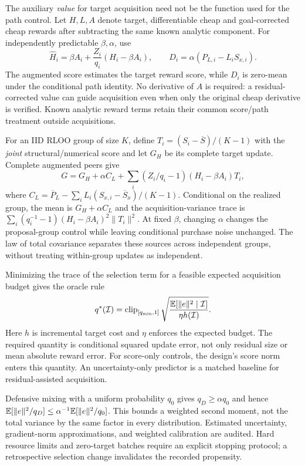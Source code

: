 The auxiliary \emph{value} for target acquisition need not be the function used for the path control. Let $H,L,A$ denote target, differentiable cheap and goal-corrected cheap rewards after subtracting the same known analytic component. For independently predictable $\beta,\alpha$, use
\begin{equation}
\widehat H_i=\beta A_i+\frac{Z_i}{q_i}(H_i-\beta A_i),
\qquad D_i=\alpha(P_{L,i}-L_iS_{x,i}).
\label{eq:value-path-separated}
\end{equation}
The augmented score estimates the target reward score, while $D_i$ is zero-mean under the conditional path identity. No derivative of $A$ is required: a residual-corrected value can guide acquisition even when only the original cheap derivative is verified. Known analytic reward terms retain their common score/path treatment outside acquisitions.

For an IID RLOO group of size $K$, define $T_i=(S_i-\overline S)/(K-1)$ with the \emph{joint} structural/numerical score and let $G_H$ be its complete target update. Complete augmented peers give
\begin{equation}
G=G_H+\alpha C_L+\sum_i(Z_i/q_i-1)(H_i-\beta A_i)T_i,
\label{eq:group-value-path}
\end{equation}
where $C_L=\overline P_L-\sum_i L_i(S_{x,i}-\overline S_x)/(K-1)$. Conditional on the realized group, the mean is $G_H+\alpha C_L$ and the acquisition-variance trace is $\sum_i(q_i^{-1}-1)(H_i-\beta A_i)^2\|T_i\|^2$. At fixed $\beta$, changing $\alpha$ changes the proposal-group control while leaving conditional purchase noise unchanged. The law of total covariance separates these sources across independent groups, without treating within-group updates as independent.

Minimizing the trace of the selection term for a feasible expected acquisition budget gives the oracle rule
\begin{equation}
q^*(\mathcal I)=\operatorname{clip}_{[q_{\min},1]}
\sqrt{\frac{\mathbb{E}[\|e\|^2\mid\mathcal I]}{\eta h(\mathcal I)}}.
\label{eq:allocation}
\end{equation}
Here $h$ is incremental target cost and $\eta$ enforces the expected budget. The required quantity is conditional squared update error, not only residual size or mean absolute reward error. For score-only controls, the design's score norm enters this quantity. An uncertainty-only predictor is a matched baseline for residual-assisted acquisition.

Defensive mixing with a uniform probability $q_0$ gives $q_D\ge\alpha q_0$ and hence $\mathbb{E}[\|e\|^2/q_D]\le\alpha^{-1}\mathbb{E}[\|e\|^2/q_0]$. This bounds a weighted second moment, not the total variance by the same factor in every distribution. Estimated uncertainty, gradient-norm approximations, and weighted calibration are audited. Hard resource limits and zero-target batches require an explicit stopping protocol; a retrospective selection change invalidates the recorded propensity.

